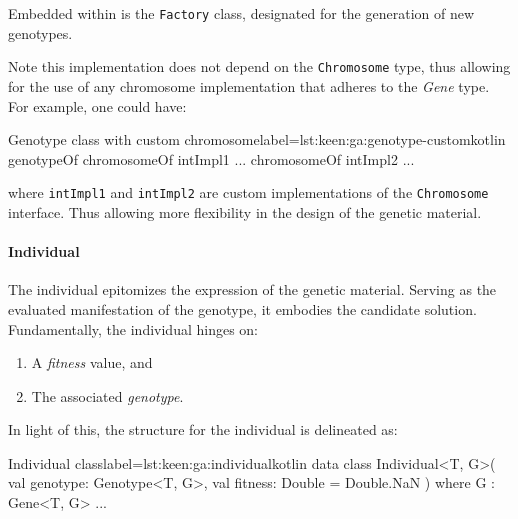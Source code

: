     Embedded within is the \texttt{Factory} class, designated for the 
    generation of new genotypes.

    Note this implementation does not depend on the \texttt{Chromosome} type,
    thus allowing for the use of any chromosome implementation that adheres to
    the \textit{Gene} type. For example, one could have:

    \begin{code}{Genotype class with custom chromosome}{label={lst:keen:ga:genotype-custom}}{kotlin}
      genotypeOf {
          chromosomeOf {
              intImpl1 { ... }
          }
          chromosomeOf {
              intImpl2 { ... }
          }
      }
    \end{code}

    \noindent where \texttt{intImpl1} and \texttt{intImpl2} are custom 
    implementations of the \texttt{Chromosome} interface.
    Thus allowing more flexibility in the design of the genetic material.

  \paragraph{Individual}
    The individual epitomizes the expression of the genetic material.
    Serving as the evaluated manifestation of the genotype, it embodies the 
    candidate solution.
    Fundamentally, the individual hinges on:
    \begin{enumerate}
        \item A \textit{fitness} value, and
        \item The associated \textit{genotype}.
    \end{enumerate}
    
    In light of this, the structure for the individual is delineated as:
    
    \begin{code}{Individual class}{label={lst:keen:ga:individual}}{kotlin}
      data class Individual<T, G>(
        val genotype: Genotype<T, G>,
        val fitness: Double = Double.NaN
      ) where G : Gene<T, G> { ... }
    \end{code}

